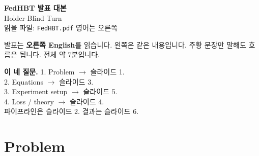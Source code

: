 \documentclass[11pt,a4paper]{article}
\begin{document}
\begin{center}
{\LARGE\bfseries\color{navy}FedHBT 발표 대본}\\[0.3em]
{\large\color{teal}Holder-Blind Turn}\\[0.35em]
{\footnotesize\color{muted}읽을 파일: \texttt{FedHBT.pdf} \quad 영어는 오른쪽}
\end{center}

\vspace{0.2em}
\noindent
발표는 \textbf{오른쪽 English}를 읽습니다. 왼쪽은 같은 내용입니다.
주황 문장만 말해도 흐름은 됩니다. 전체 약 7분입니다.

\begin{tcolorbox}[colback=sand,colframe=teal,boxrule=0.5pt,arc=1pt,
  left=7pt,right=7pt,top=5pt,bottom=5pt]
{\color{navy}\textbf{이 네 질문.}}
1. Problem $\rightarrow$ 슬라이드 1.\\
2. Equations $\rightarrow$ 슬라이드 3.\\
3. Experiment setup $\rightarrow$ 슬라이드 5.\\
4. Loss / theory $\rightarrow$ 슬라이드 4.\\
파이프라인은 슬라이드 2. 결과는 슬라이드 6.
\end{tcolorbox}

\section{Problem}
\end{document}
